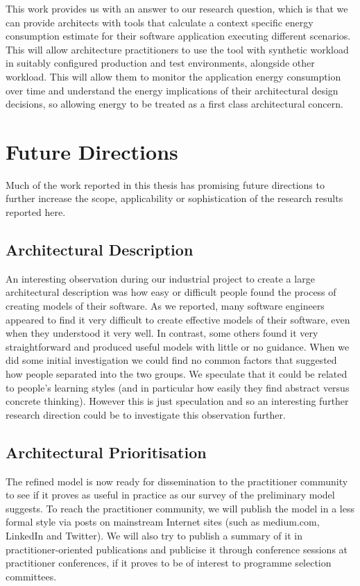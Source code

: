 This work provides us with an answer to our research question, which is that we can provide architects with tools that calculate a context specific energy consumption estimate for their software application executing different scenarios.  This will allow architecture practitioners to use the tool with synthetic workload in suitably configured production and test environments, alongside other workload.  This will allow them to monitor the application energy consumption over time and understand the energy implications of their architectural design decisions, so allowing energy to be treated as a first class architectural concern.

\section{Future Directions}

Much of the work reported in this thesis has promising future directions to further increase the scope, applicability or sophistication of the research results reported here.

\subsection{Architectural Description}

An interesting observation during our industrial project to create a large architectural description was how easy or difficult people found the process of creating models of their software.  As we reported, many software engineers appeared to find it very difficult to create effective models of their software, even when they understood it very well.  In contrast, some others found it very straightforward and produced useful models with little or no guidance.  When we did some initial investigation we could find no common factors that suggested how people separated into the two groups.  We speculate that it could be related to people's learning styles (and in particular how easily they find abstract versus concrete thinking).  However this is just speculation and so an interesting further research direction could be to investigate this observation further.

\subsection{Architectural Prioritisation}

The refined model is now ready for dissemination to the practitioner community to see if it proves as useful in practice as our survey of the preliminary model suggests.  To reach the practitioner community, we will publish the model in a less formal style via posts on mainstream Internet sites (such as medium.com, LinkedIn and Twitter).  We will also try to publish a summary of it in practitioner-oriented publications and publicise it through conference sessions at practitioner conferences, if it proves to be of interest to programme selection committees.

